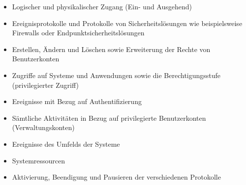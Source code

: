 \documentclass[11pt,a4paper,hidelinks]{article}   %
\begin{document}
                \begin{itemize}
                    \item Logischer und physikalischer Zugang (Ein- und Ausgehend)
                    \item Ereignisprotokolle und Protokolle von Sicherheitslösungen wie beispielsweise Firewalls oder Endpunktsicherheitslösungen
                    \item Erstellen, Ändern und Löschen sowie Erweiterung der Rechte von Benutzerkonten
                    \item Zugriffe auf Systeme und Anwendungen sowie die Berechtigungsstufe (privilegierter Zugriff)
                    \item Ereignisse mit Bezug auf Authentifizierung
                    \item Sämtliche Aktivitäten in Bezug auf privilegierte Benutzerkonten (Verwaltungskonten)
                    \item Ereignisse des Umfelds der Systeme
                    \item Systemressourcen
                    \item Aktivierung, Beendigung und Pausieren der verschiedenen Protokolle
                \end{itemize} 
\end{document}
